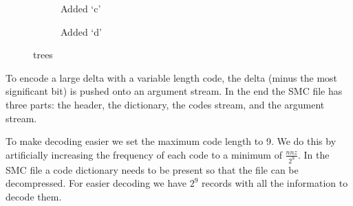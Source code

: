 \begin{figure}
\begin{subfigure}{.5\linewidth}
\begin{tikzpicture}
        \end{tikzpicture}
        \caption{Added `c'}
        \label{fig:Huffmantree3}
    \end{subfigure}
    \begin{subfigure}{.45\linewidth}
        \centering
        \caption{Added `d'}
        \label{fig:Huffmantree3}
    \end{subfigure}
    \caption{trees}
    \label{fig:huffman_tree}
\end{figure}

To encode a large delta with a variable length code, the delta (minus the most significant bit) is pushed onto an argument stream. In the end the SMC file has three parts: the header, the dictionary, the codes stream, and the argument stream.

To make decoding easier we set the maximum code length to 9. We do this by artificially increasing the frequency of each code to a minimum of $\frac{nnz}{2^9}$. In the SMC file a code dictionary needs to be present so that the file can be decompressed. For easier decoding we have $2^9$ records with all the information to decode them.

